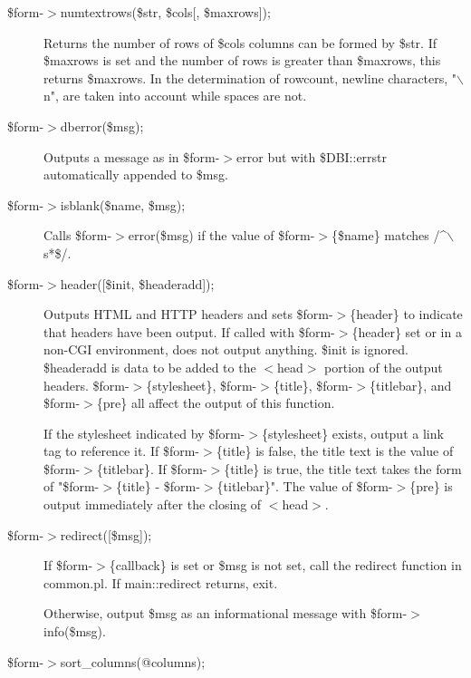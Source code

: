 \begin{description}
\begin{description}
\begin{description}
\begin{description}
\begin{description}
\begin{description}
\item[{\$form-$>$numtextrows(\$str, \$cols[, \$maxrows]);}] \mbox{}

Returns the number of rows of \$cols columns can be formed by \$str.  If \$maxrows
is set and the number of rows is greater than \$maxrows, this returns \$maxrows.
In the determination of rowcount, newline characters, "$\backslash$n", are taken into
account while spaces are not.


\item[{\$form-$>$dberror(\$msg);}] \mbox{}

Outputs a message as in \$form-$>$error but with \$DBI::errstr automatically
appended to \$msg.


\item[{\$form-$>$isblank(\$name, \$msg);}] \mbox{}

Calls \$form-$>$error(\$msg) if the value of \$form-$>$\{\$name\} matches /\^{}$\backslash$s*\$/.


\item[{\$form-$>$header([\$init, \$headeradd]);}] \mbox{}

Outputs HTML and HTTP headers and sets \$form-$>$\{header\} to indicate that headers
have been output.  If called with \$form-$>$\{header\} set or in a non-CGI
environment, does not output anything.  \$init is ignored.  \$headeradd is data
to be added to the $<$head$>$ portion of the output headers.  \$form-$>$\{stylesheet\},
\$form-$>$\{title\}, \$form-$>$\{titlebar\}, and \$form-$>$\{pre\} all affect the output of
this function.



If the stylesheet indicated by \$form-$>$\{stylesheet\} exists, output a link tag
to reference it.  If \$form-$>$\{title\} is false, the title text is the value of
\$form-$>$\{titlebar\}.  If \$form-$>$\{title\} is true, the title text takes the form of
"\$form-$>$\{title\} - \$form-$>$\{titlebar\}".  The value of \$form-$>$\{pre\} is output 
immediately after the closing of $<$head$>$.


\item[{\$form-$>$redirect([\$msg]);}] \mbox{}

If \$form-$>$\{callback\} is set or \$msg is not set, call the redirect function in
common.pl.  If main::redirect returns, exit.



Otherwise, output \$msg as an informational message with \$form-$>$info(\$msg).


\item[{\$form-$>$sort\_columns(@columns);}] \mbox{}


\end{description}
\end{description}
\end{description}
\end{description}
\end{description}
\end{description}
